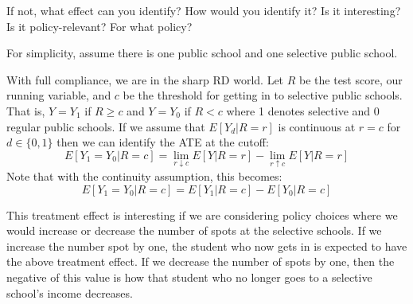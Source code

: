 \documentclass{article}
\begin{document}
\begin{problem}{2}
If not, what effect can you identify? How would you identify it? Is it interesting? Is it policy-relevant? For what policy?
\end{problem}
\begin{solution}
For simplicity, assume there is one public school and one selective public school.

With full compliance, we are in the sharp RD world. Let $R$ be the test score, our running variable, and $c$ be the threshold for getting in to selective public schools. That is, $Y=Y_1$ if $R\geq c$ and $Y=Y_0$ if $R<c$ where 1 denotes selective and 0 regular public schools. If we assume that $E[Y_d | R = r]$ is continuous at $r=c$ for $d \in \{0,1\}$ then we can identify the ATE at the cutoff:
\begin{equation*}
    E[Y_1=Y_0 | R=c] =  \lim_{r \downarrow c} E[Y|R=r] - \lim_{r \uparrow c} E[Y|R=r]
\end{equation*}
Note that with the continuity assumption, this becomes:
\begin{equation*}
    E[Y_1=Y_0 | R=c] =  E[Y_1|R=c] -  E[Y_0|R=c]
\end{equation*}

This treatment effect is interesting if we are considering policy choices where we would increase or decrease the number of spots at the selective schools. If we increase the number spot by one, the student who now gets in is expected to have the above treatment effect. If we decrease the number of spots by one, then the negative of this value is how that student who no longer goes to a selective school's income decreases.

\end{solution}
\end{document}
